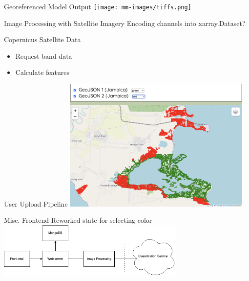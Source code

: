 \begin{frame}{Georeferenced Model Output}
    \centering
    \texttt{[image: mm-images/tiffs.png]}
\end{frame}

\begin{frame}{Image Processing with Satellite Imagery}
    Encoding channels into xarray.Dataset?  
\end{frame}

\begin{frame}{Copernicus Satellite Data}
    \begin{itemize}
        \item Request band data
        \item Calculate features
    \end{itemize}    
\end{frame}

\begin{frame}{User Upload Pipeline}
    \centering
    \includegraphics[height=0.7\textheight,width=0.7\textwidth,keepaspectratio]{mm-images/geojson-colors.png}
\end{frame}

\begin{frame}{Misc. Frontend}
    Reworked state for selecting color
    \centering
    \includegraphics[height=0.7\textheight,width=0.7\textwidth,keepaspectratio]{mm-images/mongo-in-components.png}
\end{frame}